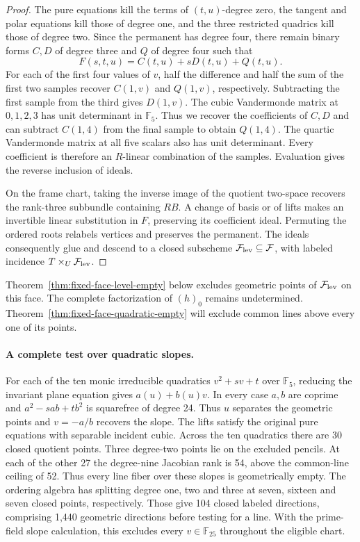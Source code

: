 \begin{proof}
The pure equations kill the terms of \((t,u)\)-degree zero, the tangent
and polar equations kill those of degree one, and the three restricted
quadrics kill those of degree two. Since the permanent has degree four,
there remain binary forms \(C,D\) of degree three and \(Q\) of degree
four such that
\[
                F(s,t,u)=C(t,u)+sD(t,u)+Q(t,u).
\]
For each of the first four values of \(v\), half the difference and
half the sum of the first two samples recover \(C(1,v)\) and \(Q(1,v)\),
respectively. Subtracting the first sample from the third gives \(D(1,v)\).
The cubic Vandermonde matrix at \(0,1,2,3\) has unit determinant in
\(\mathbb F_5\). Thus we recover the coefficients of \(C,D\) and can
subtract \(C(1,4)\) from the final sample to obtain \(Q(1,4)\).
The quartic Vandermonde matrix at all five scalars also has unit determinant.
Every coefficient is therefore an \(R\)-linear combination of the
samples. Evaluation gives the reverse inclusion of ideals.

On the frame chart, taking the inverse image of the quotient two-space
recovers the rank-three subbundle containing \(RB\). A change of basis
or of lifts makes an invertible linear substitution in \(F\), preserving
its coefficient ideal. Permuting the ordered roots relabels vertices and
preserves the permanent. The ideals consequently glue and descend to a
closed subscheme \(\mathcal F_{\rm lev}\subseteq\mathcal F\), with labeled
incidence \(T\times_U\mathcal F_{\rm lev}\).
\end{proof}

Theorem~\ref{thm:fixed-face-level-empty} below excludes geometric points
of \(\mathcal F_{\rm lev}\) on this face. The complete factorization of
\((h)_0\) remains undetermined. Theorem~\ref{thm:fixed-face-quadratic-empty}
will exclude common lines above every one of its points.

\paragraph{A complete test over quadratic slopes.}
For each of the ten monic irreducible quadratics \(v^2+sv+t\) over
\(\mathbb F_5\), reducing the invariant plane equation gives
\(a(u)+b(u)v\). In every case \(a,b\) are coprime and
\(a^2-sab+tb^2\) is squarefree of degree 24. Thus \(u\) separates
the geometric points and \(v=-a/b\) recovers the slope. The lifts
satisfy the original pure equations with separable incident cubic.
Across the ten quadratics there are 30 closed quotient points.
Three degree-two points lie on the excluded pencils. At each of the
other 27 the degree-nine Jacobian rank is 54, above the common-line
ceiling of 52. Thus every line fiber over these slopes is geometrically
empty. The ordering algebra has splitting degree one, two and three
at seven, sixteen and seven closed points, respectively. Those give
104 closed labeled directions, comprising 1,440 geometric directions
before testing for a line. With the prime-field slope calculation,
this excludes every \(v\in\mathbb F_{25}\) throughout the eligible chart.

